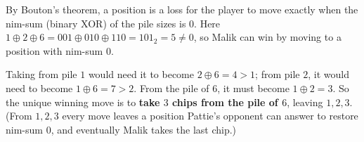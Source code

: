 By Bouton's theorem, a position is a loss for the player to move exactly when the nim-sum (binary XOR) of the pile sizes is $0$. Here $1\oplus2\oplus6=001\oplus010\oplus110=101_2=5\ne0$, so Malik can win by moving to a position with nim-sum $0$.

Taking from pile $1$ would need it to become $2\oplus6=4>1$; from pile $2$, it would need to become $1\oplus6=7>2$. From the pile of $6$, it must become $1\oplus2=3$. So the unique winning move is to \textbf{take $3$ chips from the pile of $6$}, leaving $1,2,3$. (From $1,2,3$ every move leaves a position Pattie's opponent can answer to restore nim-sum $0$, and eventually Malik takes the last chip.)
